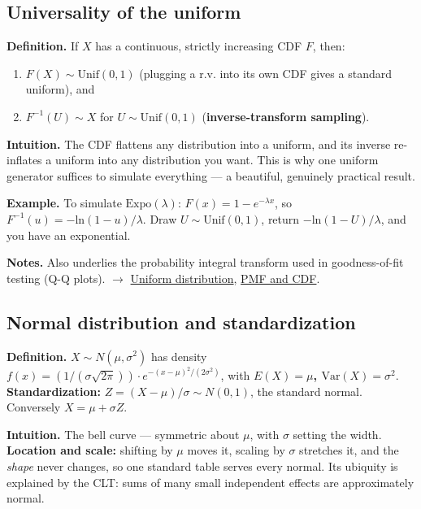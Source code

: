 \documentclass[11pt,a4paper]{article}
\begin{document}
\subsection{Universality of the uniform}\label{sec:universality-of-the-uniform}

\textbf{Definition.} If $X$ has a continuous, strictly increasing CDF $F$, then:
\begin{enumerate}[leftmargin=1.4em]
\item $F(X) \sim \mathrm{Unif}(0, 1)$ (plugging a r.v. into its own CDF gives a standard uniform), and
\item $F^{-1}(U) \sim X$ for $U \sim \mathrm{Unif}(0,1)$ (\textbf{inverse-transform sampling}).
\end{enumerate}

\textbf{Intuition.} The CDF flattens any distribution into a uniform, and its inverse re-inflates a uniform into any distribution you want. This is why one uniform generator suffices to simulate everything --- a beautiful, genuinely practical result.

\textbf{Example.} To simulate $\mathrm{Expo}(\lambda )$: $F(x) = 1 - e^{-\lambda x}$, so $F^{-1}(u) = -\mathrm{ln}(1-u)/\lambda$. Draw $U \sim \mathrm{Unif}(0,1)$, return $-\mathrm{ln}(1-U)/\lambda$, and you have an exponential.

\textbf{Notes.} Also underlies the probability integral transform used in goodness-of-fit testing (Q-Q plots). $\to$ \hyperref[sec:uniform-distribution]{Uniform distribution}, \hyperref[sec:pmf-and-cdf]{PMF and CDF}.

\subsection{Normal distribution and standardization}\label{sec:normal-distribution-and-standardization}

\textbf{Definition.} $X \sim N(\mu , \sigma ^{2})$ has density $f(x) = (1/(\sigma \sqrt{2\pi }))\cdot e^{-(x-\mu )^{2}/(2\sigma ^{2})}$, with \textbf{$E(X) = \mu$, $\mathrm{Var}(X) = \sigma ^{2}$}. \textbf{Standardization:} $Z = (X - \mu )/\sigma  \sim N(0,1)$, the standard normal. Conversely $X = \mu  + \sigma Z$.

\textbf{Intuition.} The bell curve --- symmetric about $\mu$, with $\sigma$ setting the width. \textbf{Location and scale:} shifting by $\mu$ moves it, scaling by $\sigma$ stretches it, and the \textit{shape} never changes, so one standard table serves every normal. Its ubiquity is explained by the CLT: sums of many small independent effects are approximately normal.
\end{document}
